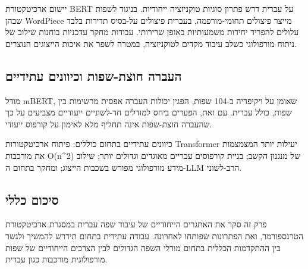 יישום ארכיטקטורת BERT על עברית דרש פתרון סוגיות טוקניזציה ייחודיות.
בניגוד לשפות שבהן WordPiece מייצר פיצולים תחומי-מורפמה, בעברית פיצולים
על-בסיס תדירות בלבד עלולים להפריד יחידות משמעותיות באופן שרירותי. עבודות
מחקר עדכניות בוחנות שילוב של ניתוח מורפולוגי כשלב עיבוד מקדים
לטוקניזציה, במטרה לשפר את איכות הייצוגים הנוצרים.

\hypertarget{ux5d4ux5e2ux5d1ux5e8ux5d4-ux5d7ux5d5ux5e6ux5ea-ux5e9ux5e4ux5d5ux5ea-ux5d5ux5dbux5d9ux5d5ux5d5ux5e0ux5d9ux5dd-ux5e2ux5eaux5d9ux5d3ux5d9ux5d9ux5dd}{%
\subsection{העברה חוצת-שפות וכיוונים
עתידיים}\label{ux5d4ux5e2ux5d1ux5e8ux5d4-ux5d7ux5d5ux5e6ux5ea-ux5e9ux5e4ux5d5ux5ea-ux5d5ux5dbux5d9ux5d5ux5d5ux5e0ux5d9ux5dd-ux5e2ux5eaux5d9ux5d3ux5d9ux5d9ux5dd}}

מודל mBERT, שאומן על ויקיפדיה ב-104 שפות, הפגין יכולות העברה אפסית
מרשימות בין שפות, כולל עברית. עם זאת, הפערים ביחס למודלים חד-לשוניים
ייעודיים מצביעים על כך שהעברה חוצת-שפות אינה תחליף מלא לאימון על קורפוס
ייעודי.

כיוונים עתידיים בתחום כוללים: פיתוח ארכיטקטורות Transformer יעילות יותר
המצמצמות את מורכבות O(n\^{}2) של מנגנון הקשב; בניית קורפוסים עבריים
מאוגדים וגדולים יותר; שילוב מידע מורפולוגי מפורש בשכבות הייצוג; ומחקר
בתחום ה-LLM הרב-לשוני.

\hypertarget{ux5e1ux5d9ux5dbux5d5ux5dd-ux5dbux5dcux5dcux5d9}{%
\subsection{סיכום
כללי}\label{ux5e1ux5d9ux5dbux5d5ux5dd-ux5dbux5dcux5dcux5d9}}

פרק זה סקר את האתגרים הייחודיים של עיבוד שפה עברית במסגרת ארכיטקטורת
הטרנספורמר, ואת הפתרונות שפותחו לאחרונה. עבודה עתידית בתחום תידרש להמשיך
ולגשר בין ההתקדמות הכללית בתחום מודלי השפה הגדולים לבין הצרכים הייחודיים
של שפות מורפולוגית מורכבות כגון עברית.
